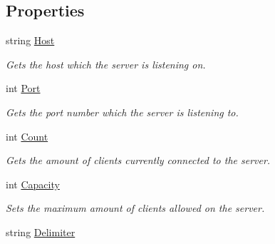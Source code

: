 \subsection*{Properties}
\begin{DoxyCompactItemize}
\item 
\hypertarget{classAsterion_1_1Server_a19bb5f819832c56f81bbc2db7b982e6d}{string \hyperlink{classAsterion_1_1Server_a19bb5f819832c56f81bbc2db7b982e6d}{Host}}\label{classAsterion_1_1Server_a19bb5f819832c56f81bbc2db7b982e6d}

\begin{DoxyCompactList}\small\item\em Gets the host which the server is listening on. \end{DoxyCompactList}\item 
\hypertarget{classAsterion_1_1Server_aa2820cd7ab117d9b0e624fb7c1ef762e}{int \hyperlink{classAsterion_1_1Server_aa2820cd7ab117d9b0e624fb7c1ef762e}{Port}}\label{classAsterion_1_1Server_aa2820cd7ab117d9b0e624fb7c1ef762e}

\begin{DoxyCompactList}\small\item\em Gets the port number which the server is listening to. \end{DoxyCompactList}\item 
\hypertarget{classAsterion_1_1Server_a755310aa1fb3da30e61963d3d60cb606}{int \hyperlink{classAsterion_1_1Server_a755310aa1fb3da30e61963d3d60cb606}{Count}}\label{classAsterion_1_1Server_a755310aa1fb3da30e61963d3d60cb606}

\begin{DoxyCompactList}\small\item\em Gets the amount of clients currently connected to the server. \end{DoxyCompactList}\item 
\hypertarget{classAsterion_1_1Server_adcdc6536b6eeaa3e4f7618775446a8f4}{int \hyperlink{classAsterion_1_1Server_adcdc6536b6eeaa3e4f7618775446a8f4}{Capacity}}\label{classAsterion_1_1Server_adcdc6536b6eeaa3e4f7618775446a8f4}

\begin{DoxyCompactList}\small\item\em Sets the maximum amount of clients allowed on the server. \end{DoxyCompactList}\item 
\hypertarget{classAsterion_1_1Server_a196c0514744f4e6a88ed5081d55709e7}{string \hyperlink{classAsterion_1_1Server_a196c0514744f4e6a88ed5081d55709e7}{Delimiter}}\label{classAsterion_1_1Server_a196c0514744f4e6a88ed5081d55709e7}


\end{DoxyCompactItemize}
